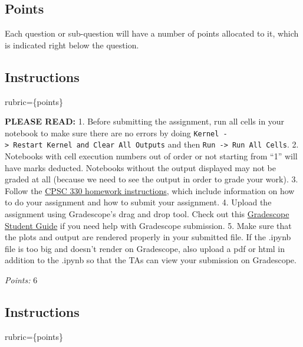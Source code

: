 \documentclass[11pt]{article}
\begin{document}
    \subsection{Points}\label{points}

Each question or sub-question will have a number of points allocated to
it, which is indicated right below the question.

    

    \subsection{Instructions}\label{instructions}

rubric=\{points\}

\textbf{PLEASE READ:} 1. Before submitting the assignment, run all cells
in your notebook to make sure there are no errors by doing
\texttt{Kernel\ -\textgreater{}\ Restart\ Kernel\ and\ Clear\ All\ Outputs}
and then \texttt{Run\ -\textgreater{}\ Run\ All\ Cells}. 2. Notebooks
with cell execution numbers out of order or not starting from ``1'' will
have marks deducted. Notebooks without the output displayed may not be
graded at all (because we need to see the output in order to grade your
work). 3. Follow the
\href{https://ubc-cs.github.io/cpsc330-2023W1-2023W1/docs/homework_instructions.html}{CPSC
330 homework instructions}, which include information on how to do your
assignment and how to submit your assignment. 4. Upload the assignment
using Gradescope's drag and drop tool. Check out this
\href{https://lthub.ubc.ca/guides/gradescope-student-guide/}{Gradescope
Student Guide} if you need help with Gradescope submission. 5. Make sure
that the plots and output are rendered properly in your submitted file.
If the .ipynb file is too big and doesn't render on Gradescope, also
upload a pdf or html in addition to the .ipynb so that the TAs can view
your submission on Gradescope.

\emph{Points:} 6

    \subsection{Instructions}\label{instructions}

rubric=\{points\}
\end{document}
